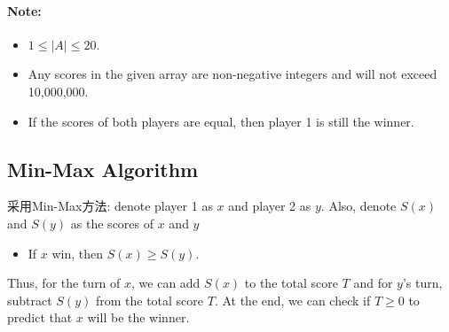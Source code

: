 \paragraph{Note:}
\begin{itemize}
\item $1 \leq \lvert A\rvert \leq 20$.
\item Any scores in the given array are non-negative integers and will not exceed 10,000,000.
\item If the scores of both players are equal, then player 1 is still the winner.
\end{itemize}

\subsection{Min-Max Algorithm}

采用Min-Max方法: denote player 1 as $x$ and player 2 as $y$. Also, denote $S(x)$ and $S(y)$ as the scores of $x$ and $y$

\begin{itemize}
\item If $x$ win, then $S(x) \geq S(y)$.
\end{itemize}

Thus, for the turn of $x$, we can add $S(x)$ to the total score $T$ and for $y$'s turn, subtract $S(y)$ from the total score $T$. At the end, we can check if $T\geq 0$ to predict that $x$ will be the winner.


